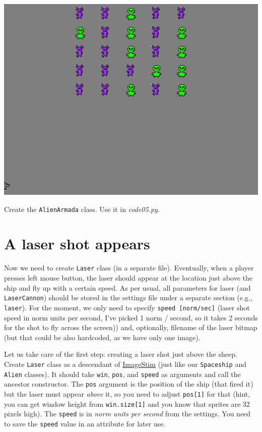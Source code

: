 \documentclass[
]{book}
\begin{document}
\begin{center}\includegraphics[width=8.89in]{images/alien-armada} \end{center}

Create the \texttt{AlienArmada} class.
Use it in \emph{code05.py}.

\hypertarget{a-laser-shot-appears}{%
\section{A laser shot appears}\label{a-laser-shot-appears}}

Now we need to create \texttt{Laser} class (in a separate file). Eventually, when a player presses left mouse button, the laser should appear at the location just above the ship and fly up with a certain speed. As per usual, all parameters for laser (and \texttt{LaserCannon}) should be stored in the settings file under a separate section (e.g., \texttt{laser}). For the moment, we only need to specify \texttt{speed\ {[}norm/sec{]}} (laser shot speed in norm units per second, I've picked 1 norm / second, so it takes 2 seconds for the shot to fly across the screen)) and, optionally, filename of the laser bitmap (but that could be also hardcoded, as we have only one image).

Let us take care of the first step: creating a laser shot just above the sheep. Create \texttt{Laser} class as a descendant of \href{https://psychopy.org/api/visual/imagestim.html\#psychopy.visual.ImageStim}{ImageStim} (just like our \texttt{Spaceship} and \texttt{Alien} classes). It should take \texttt{win}, \texttt{pos}, and \texttt{speed} as arguments and call the ancestor constructor. The \texttt{pos} argument is the position of the ship (that fired it) but the laser must appear \emph{above} it, so you need to adjust \texttt{pos{[}1{]}} for that (hint, you can get window height from \texttt{win.size{[}1{]}} and you know that sprites are 32 pixels high). The \texttt{speed} is in \emph{norm units per second} from the settings. You need to save the \texttt{speed} value in an attribute for later use.
\end{document}
